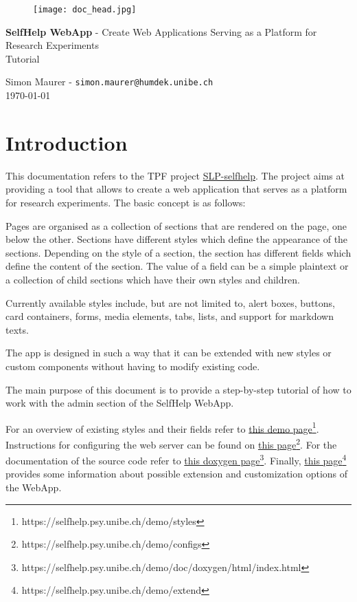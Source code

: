 \documentclass[a4paper,oneside]{book}
\begin{document}
\begin{figure}[h]
  \texttt{[image: doc\_head.jpg]}
\end{figure}

\parindent=0pt
\parskip=0.25cm

\begin{center}
\fontsize{20}{21}\selectfont

\textbf{SelfHelp WebApp} - Create Web Applications Serving as a Platform for Research Experiments\\
\vskip 6mm
Tutorial
\vskip 6mm

\fontsize{13}{14}\selectfont
Simon Maurer - \texttt{simon.maurer@humdek.unibe.ch}\\
\today
\end{center}

\tableofcontents

\chapter{Introduction}\label{sec.intro}

This documentation refers to the TPF project \href{http://phhum-g111-nns.unibe.ch:10012/SLP/SLP-sleep_coach}{SLP-selfhelp}.
The project aims at providing a tool that allows to create a web application that serves as a platform for research experiments.
The basic concept is as follows:

Pages are organised as a collection of sections that are rendered on the page, one below the other.
Sections have different styles which define the appearance of the sections.
Depending on the style of a section, the section has different fields which define the content of the section.
The value of a field can be a simple plaintext or a collection of child sections which have their own styles and children.

Currently available styles include, but are not limited to, alert boxes, buttons, card containers, forms, media elements, tabs, lists, and support for markdown texts.

The app is designed in such a way that it can be extended with new styles or custom components without having to modify existing code.

The main purpose of this document is to provide a step-by-step tutorial of how to work with the admin section of the SelfHelp WebApp.

For an overview of existing styles and their fields refer to \href{https://selfhelp.psy.unibe.ch/demo/styles}{this demo page}\footnote{https://selfhelp.psy.unibe.ch/demo/styles}.
Instructions for configuring the web server can be found on \href{https://selfhelp.psy.unibe.ch/demo/configs}{this page}\footnote{https://selfhelp.psy.unibe.ch/demo/configs}.
For the documentation of the source code refer to \href{https://selfhelp.psy.unibe.ch/demo/doc/doxygen/html/index.html}{this doxygen page}\footnote{https://selfhelp.psy.unibe.ch/demo/doc/doxygen/html/index.html}.
Finally, \href{https://selfhelp.psy.unibe.ch/demo/extend}{this page}\footnote{https://selfhelp.psy.unibe.ch/demo/extend} provides some information about possible extension and customization options of the WebApp.
\end{document}
